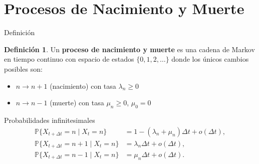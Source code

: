 \documentclass[aspectratio=169]{beamer}
\theoremstyle{plain}
\theoremstyle{definition}
\newtheorem{definicion}{Definición}
\newcommand{\Prob}{\mathbb{P}}
\newcommand{\1}{\mathbf{1}}
\begin{document}
\section{Procesos de Nacimiento y Muerte}

\begin{frame}{Definición}
  \begin{definicion}
    Un \textbf{proceso de nacimiento y muerte} es una cadena de Markov en tiempo continuo con espacio de estados $\{0,1,2,\ldots\}$ donde los únicos cambios posibles son:
    \begin{itemize}
      \item $n \to n+1$ (nacimiento) con tasa $\lambda_n \geq 0$
      \item $n \to n-1$ (muerte) con tasa $\mu_n \geq 0$, $\mu_0 = 0$
    \end{itemize}
  \end{definicion}
  
  \vspace{0.5cm}
  
  \begin{center}
  \end{center}
\end{frame}

\begin{frame}{Probabilidades infinitesimales}
  \begin{align*}
    \Prob\{X_{t+\Delta t} = n \mid X_t = n\} &= 1 - (\lambda_n + \mu_n)\Delta t + o(\Delta t),\\
    \Prob\{X_{t+\Delta t} = n+1 \mid X_t = n\} &= \lambda_n \Delta t + o(\Delta t),\\
    \Prob\{X_{t+\Delta t} = n-1 \mid X_t = n\} &= \mu_n \Delta t + o(\Delta t).
  \end{align*}
\end{frame}
\end{document}

